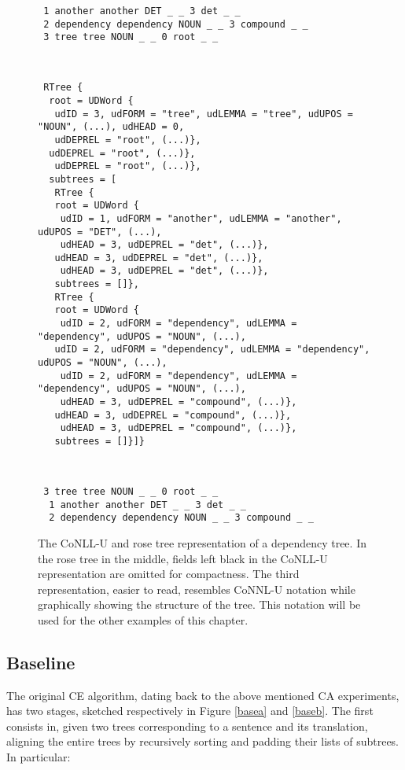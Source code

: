 \begin{figure}[H]
  \centering
  \scriptsize
  \begin{verbatim}
 1 another another DET _ _ 3 det _ _
 2 dependency dependency NOUN _ _ 3 compound _ _
 3 tree tree NOUN _ _ 0 root _ _
 
  \end{verbatim}
  \begin{verbatim}
   
 RTree {
  root = UDWord {
   udID = 3, udFORM = "tree", udLEMMA = "tree", udUPOS = "NOUN", (...), udHEAD = 0,
   udDEPREL = "root", (...)}, 
  udDEPREL = "root", (...)}, 
   udDEPREL = "root", (...)}, 
  subtrees = [
   RTree {
   root = UDWord {
    udID = 1, udFORM = "another", udLEMMA = "another", udUPOS = "DET", (...),
    udHEAD = 3, udDEPREL = "det", (...)}, 
   udHEAD = 3, udDEPREL = "det", (...)}, 
    udHEAD = 3, udDEPREL = "det", (...)}, 
   subtrees = []},
   RTree {
   root = UDWord {
    udID = 2, udFORM = "dependency", udLEMMA = "dependency", udUPOS = "NOUN", (...), 
   udID = 2, udFORM = "dependency", udLEMMA = "dependency", udUPOS = "NOUN", (...), 
    udID = 2, udFORM = "dependency", udLEMMA = "dependency", udUPOS = "NOUN", (...), 
    udHEAD = 3, udDEPREL = "compound", (...)}, 
   udHEAD = 3, udDEPREL = "compound", (...)}, 
    udHEAD = 3, udDEPREL = "compound", (...)}, 
   subtrees = []}]}
 
  \end{verbatim}
 
  \begin{verbatim}
   
 3 tree tree NOUN _ _ 0 root _ _
  1 another another DET _ _ 3 det _ _
  2 dependency dependency NOUN _ _ 3 compound _ _
  \end{verbatim}
  \caption[The CoNLL-U and rose tree representations of a dependency tree]{The CoNLL-U and rose tree representation of a dependency tree. In the rose tree in the middle, fields left black in the CoNLL-U representation are omitted for compactness. The third representation, easier to read, resembles CoNNL-U notation while graphically showing the structure of the tree. This notation will be used for the other examples of this chapter.}
  \label{deptree}
 \end{figure}

\subsection{Baseline} \label{baseline}
The original CE algorithm, dating back to the above mentioned CA experiments, has two stages, sketched respectively in Figure \ref{basea} and \ref{baseb}. The first consists in, given two trees corresponding to a sentence and its translation, aligning the entire trees by recursively sorting and padding their lists of subtrees. In particular: \smallskip

